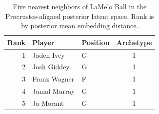 \begin{table}[htbp]
  \centering\small
  \begin{tabular}{rllc}
    \toprule
    Rank & Player & Position & Archetype \\
    \midrule
    1 & Jaden Ivey & G & 1 \\
    2 & Josh Giddey & G & 1 \\
    3 & Franz Wagner & F & 1 \\
    4 & Jamal Murray & G & 1 \\
    5 & Ja Morant & G & 1 \\
    \bottomrule
  \end{tabular}
  \caption{Five nearest neighbors of LaMelo Ball in the Procrustes-aligned posterior latent space. Rank is by posterior mean embedding distance.}
  \label{tab:LaMelo_Ball_neighbors}
\end{table}

